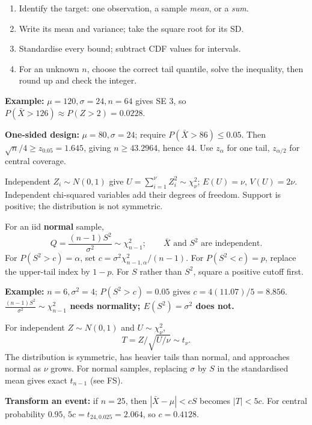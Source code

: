 \documentclass[10pt]{article}
\newcommand{\warn}[1]{\textbf{\color{red!65!black}#1}}
\newcommand{\boxstart}[1]{\begin{tcolorbox}[title={#1},sharp corners]}
\newcommand{\boxend}{\end{tcolorbox}}
\begin{document}
\begin{multicols*}{3}
\boxstart{Ch. 5 --- CLT probabilities and sample-size questions}
\begin{enumerate}
\item Identify the target: one observation, a sample \emph{mean}, or a \emph{sum}.
\item Write its mean and variance; take the square root for its SD.
\item Standardise every bound; subtract CDF values for intervals.
\item For an unknown $n$, choose the correct tail quantile, solve the inequality, then round up and check the integer.
\end{enumerate}
\textbf{Example:} $\mu=120,\sigma=24,n=64$ gives SE $3$, so $P(\bar X>126)\approx P(Z>2)=0.0228$.

\textbf{One-sided design:} $\mu=80,\sigma=24$; require $P(\bar X>86)\le0.05$. Then $\sqrt n/4\ge z_{0.05}=1.645$, giving $n\ge43.2964$, hence $44$. Use $z_{\alpha}$ for one tail, $z_{\alpha/2}$ for central coverage.
\boxend

\boxstart{Ch. 5 --- Chi-squared and sample-variance events}
Independent $Z_i\sim N(0,1)$ give $U=\sum_{i=1}^\nu Z_i^2\sim\chi^2_\nu$; $E(U)=\nu$, $V(U)=2\nu$. Independent chi-squared variables add their degrees of freedom. Support is positive; the distribution is not symmetric.

For an iid \textbf{normal} sample,
\[
Q=\frac{(n-1)S^2}{\sigma^2}\sim\chi^2_{n-1};\qquad \bar X\text{ and }S^2\text{ are independent}.
\]
For $P(S^2>c)=\alpha$, set
$c=\sigma^2\chi^2_{n-1,\alpha}/(n-1)$.
For $P(S^2<c)=p$, replace the upper-tail index by $1-p$. For $S$ rather than $S^2$, square a positive cutoff first.

\textbf{Example:} $n=6,\sigma^2=4$; $P(S^2>c)=0.05$ gives $c=4(11.07)/5=8.856$. \\
\warn{$\frac{(n-1)S^2}{\sigma^2}\sim\chi^2_{n-1}$ needs normality; $E(S^2)=\sigma^2$ does not.}
\boxend

\boxstart{Ch. 5 --- Student's t and central probabilities}
For independent $Z\sim N(0,1)$ and $U\sim\chi^2_\nu$,
\[
T=Z/\sqrt{U/\nu}\sim t_\nu.
\]
The distribution is symmetric, has heavier tails than normal, and approaches normal as $\nu$ grows. For normal samples, replacing $\sigma$ by $S$ in the standardised mean gives exact $t_{n-1}$ (see FS).

\textbf{Transform an event:} if $n=25$, then $|\bar X-\mu|<cS$ becomes $|T|<5c$. For central probability $0.95$, $5c=t_{24,0.025}=2.064$, so $c=0.4128$.
\boxend


\end{multicols*}
\end{document}
